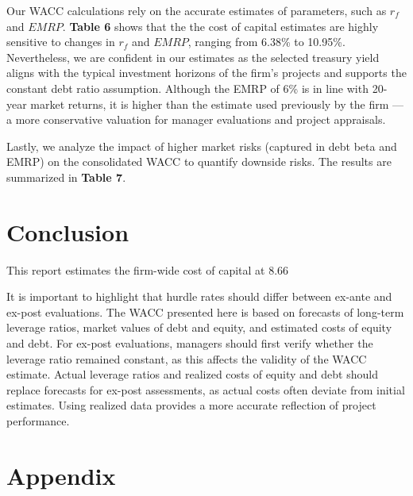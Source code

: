 \documentclass[AER]{AEA}
\begin{document}
\begin{spacing}{1.5}
Our WACC calculations rely on the accurate estimates of parameters, such as $r_f$ and $EMRP$. \textbf{Table 6} shows that the the cost of capital estimates are highly sensitive to changes in $r_f$ and $EMRP$, ranging from 6.38\% to 10.95\%. Nevertheless, we are confident in our estimates as the selected treasury yield aligns with the typical investment horizons of the firm's projects and supports the constant debt ratio assumption. Although the EMRP of 6\% is in line with 20-year market returns, it is higher than the estimate used previously by the firm — a more conservative valuation for manager evaluations and project appraisals.

Lastly, we analyze the impact of higher market risks (captured in debt beta and EMRP) on the consolidated WACC to quantify downside risks. The results are summarized in \textbf{Table 7}.

\section{Conclusion}

This report estimates the firm-wide cost of capital at 8.66%

It is important to highlight that hurdle rates should differ between ex-ante and ex-post evaluations. The WACC presented here is based on forecasts of long-term leverage ratios, market values of debt and equity, and estimated costs of equity and debt. For ex-post evaluations, managers should first verify whether the leverage ratio remained constant, as this affects the validity of the WACC estimate. Actual leverage ratios and realized costs of equity and debt should replace forecasts for ex-post assessments, as actual costs often deviate from initial estimates. Using realized data provides a more accurate reflection of project performance.

\printbibliography

\section{Appendix}


\end{spacing}
\end{document}
